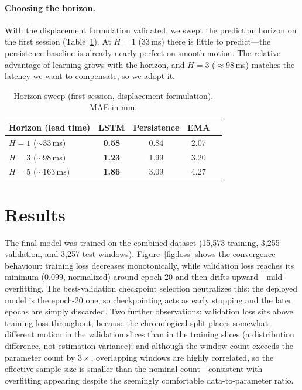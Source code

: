 \documentclass[11pt,a4paper]{article}
\begin{document}
\paragraph{Choosing the horizon.} With the displacement formulation validated,
we swept the prediction horizon on the first session
(Table~\ref{tab:horizon}). At $H{=}1$ (33\,ms) there is little to predict---the
persistence baseline is already nearly perfect on smooth motion. The relative
advantage of learning grows with the horizon, and $H{=}3$ ($\approx$98\,ms)
matches the latency we want to compensate, so we adopt it.

\begin{table}[t]
  \centering
  \caption{Horizon sweep (first session, displacement formulation). MAE in mm.}
  \label{tab:horizon}
  \begin{tabular}{lcccc}
    \toprule
    Horizon (lead time) & LSTM & Persistence & EMA \\
    \midrule
    $H=1$ ($\sim$33\,ms)  & \textbf{0.58} & 0.84 & 2.07 \\
    $H=3$ ($\sim$98\,ms)  & \textbf{1.23} & 1.99 & 3.20 \\
    $H=5$ ($\sim$163\,ms) & \textbf{1.86} & 3.09 & 4.27 \\
    \bottomrule
  \end{tabular}
\end{table}

\section{Results}
\label{sec:results}

The final model was trained on the combined dataset (15{,}573 training,
3{,}255 validation, and 3{,}257 test windows). Figure~\ref{fig:loss} shows the
convergence behaviour: training loss decreases monotonically, while validation
loss reaches its minimum ($0.099$, normalized) around epoch 20 and then drifts
upward---mild overfitting. The best-validation checkpoint selection neutralizes
this: the deployed model is the epoch-20 one, so checkpointing acts as early
stopping and the later epochs are simply discarded. Two further observations:
validation loss sits above training loss throughout, because the chronological
split places somewhat different motion in the validation slices than in the
training slices (a distribution difference, not estimation variance); and
although the window count exceeds the parameter count by $3\times$,
overlapping windows are highly correlated, so the effective sample size is
smaller than the nominal count---consistent with overfitting appearing despite
the seemingly comfortable data-to-parameter ratio.
\end{document}
